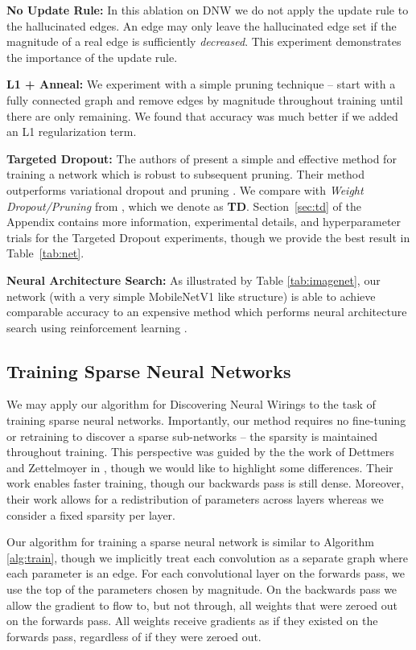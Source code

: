\documentclass{article}
\begin{document}
\textbf{No Update Rule:} In this ablation on DNW we do not apply the update rule to the hallucinated edges. An edge may only leave the hallucinated edge set if the magnitude of a real edge is sufficiently \textit{decreased}. This experiment demonstrates the importance of the update rule.

\textbf{L1 + Anneal:} We experiment with a simple pruning technique -- start with a fully connected graph and remove edges by magnitude throughout training until there are only  remaining. We found that accuracy was much better if we added an L1 regularization term.

\textbf{Targeted Dropout:} The authors of \cite{td} present a simple and effective method for training a network which is robust to subsequent pruning. Their method outperforms variational dropout \cite{vd} and  pruning \cite{l0}. We compare with \textit{Weight Dropout/Pruning} from \cite{td}, which we denote as \textbf{TD}. Section~\ref{sec:td} of the Appendix contains more information, experimental details, and hyperparameter trials for the Targeted Dropout experiments, though we provide the best result in Table~\ref{tab:net}.

\textbf{Neural Architecture Search:} As illustrated by Table \ref{tab:imagenet}, our network (with a very simple MobileNetV1 like structure) is able to achieve comparable accuracy to an expensive method which performs neural architecture search using reinforcement learning \cite{mnasnet}. 

\subsection{Training Sparse Neural Networks}

We may apply our algorithm for Discovering Neural Wirings to the task of training sparse neural networks. Importantly, our method requires no fine-tuning or retraining to discover a sparse sub-networks -- the sparsity is maintained throughout training. This perspective was guided by the the work of Dettmers and Zettelmoyer in \cite{sparse}, though we would like to highlight some differences. Their work enables faster training, though our backwards pass is still dense. Moreover, their work allows for a redistribution of parameters across layers whereas we consider a fixed sparsity per layer.

Our algorithm for training a sparse neural network is similar to Algorithm \ref{alg:train}, though we implicitly treat each convolution as a separate graph where each parameter is an edge. For each convolutional layer on the forwards pass, we use the top  of the parameters chosen by magnitude. On the backwards pass we allow the gradient to flow to, but not through, all weights that were zeroed out on the forwards pass. All weights receive gradients as if they existed on the forwards pass, regardless of if they were zeroed out.
\end{document}
